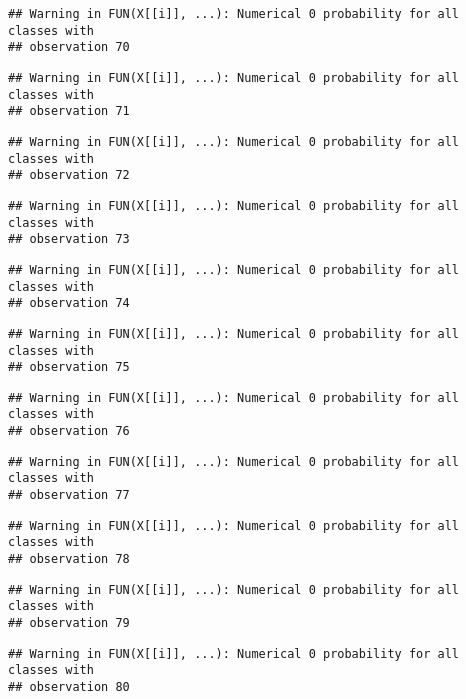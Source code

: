 \documentclass[
]{article}
\begin{document}
\begin{verbatim}
## Warning in FUN(X[[i]], ...): Numerical 0 probability for all classes with
## observation 70
\end{verbatim}

\begin{verbatim}
## Warning in FUN(X[[i]], ...): Numerical 0 probability for all classes with
## observation 71
\end{verbatim}

\begin{verbatim}
## Warning in FUN(X[[i]], ...): Numerical 0 probability for all classes with
## observation 72
\end{verbatim}

\begin{verbatim}
## Warning in FUN(X[[i]], ...): Numerical 0 probability for all classes with
## observation 73
\end{verbatim}

\begin{verbatim}
## Warning in FUN(X[[i]], ...): Numerical 0 probability for all classes with
## observation 74
\end{verbatim}

\begin{verbatim}
## Warning in FUN(X[[i]], ...): Numerical 0 probability for all classes with
## observation 75
\end{verbatim}

\begin{verbatim}
## Warning in FUN(X[[i]], ...): Numerical 0 probability for all classes with
## observation 76
\end{verbatim}

\begin{verbatim}
## Warning in FUN(X[[i]], ...): Numerical 0 probability for all classes with
## observation 77
\end{verbatim}

\begin{verbatim}
## Warning in FUN(X[[i]], ...): Numerical 0 probability for all classes with
## observation 78
\end{verbatim}

\begin{verbatim}
## Warning in FUN(X[[i]], ...): Numerical 0 probability for all classes with
## observation 79
\end{verbatim}

\begin{verbatim}
## Warning in FUN(X[[i]], ...): Numerical 0 probability for all classes with
## observation 80
\end{verbatim}
\end{document}
